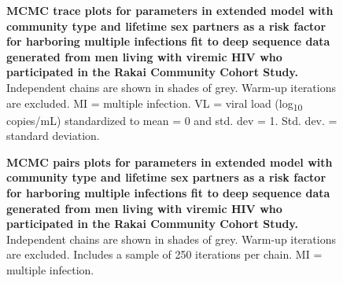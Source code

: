 \documentclass[10pt,letterpaper]{article}
\begin{document}
\begin{figure}[!ht]
\caption{{\bf MCMC trace plots for parameters in extended model with community type and lifetime sex partners as a risk factor for harboring multiple infections fit to deep sequence data generated from  men living with viremic HIV who participated in the Rakai Community Cohort Study.} Independent chains are shown in shades of grey. Warm-up iterations are excluded. MI = multiple infection. VL = viral load (log\textsubscript{10} copies/mL) standardized to mean = 0 and std. dev = 1. Std. dev. = standard deviation.}
\end{figure}

\begin{figure}[!ht]
\caption{{\bf MCMC  pairs plots for parameters in extended model with community type and lifetime sex partners as a risk factor for harboring multiple infections fit to deep sequence data generated from  men living with viremic HIV who participated in the Rakai Community Cohort Study.} Independent chains are shown in shades of grey. Warm-up iterations are excluded. Includes a sample of 250 iterations per chain. MI = multiple infection. }
\end{figure}
\end{document}
